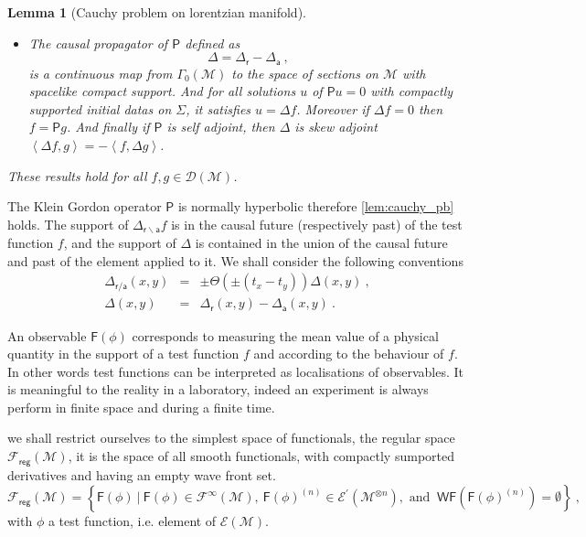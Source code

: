 \documentclass[10pt]{book}
\newcommand{\WF}{\mathsf{WF}}
\newcommand{\sm}[1]{\left\langle#1\right\rangle}
\newcommand{\Dcal}{\mathcal{D}}
\newcommand{\Ecal}{\mathcal{E}}
\newcommand{\Fcal}{\mathcal{F}}
\newcommand{\Mcal}{\mathcal{M}}
\newcommand{\Fsf}{\mathsf{F}}
\newcommand{\Psf}{\mathsf{P}}
\newcommand{\asf}{\mathsf{a}}
\newcommand{\rsf}{\mathsf{r}}
\theoremstyle{break}
\newtheorem{lemma}{Lemma}
\begin{document}
\begin{lemma}[Cauchy problem on lorentzian manifold]
\begin{itemize}
\item The causal propagator of $\Psf$ defined as
%
\begin{equation*}
\Delta = \Delta_\rsf - \Delta_\asf \ ,
\end{equation*}
%
is a continuous map from $\Gamma_0(\Mcal)$ to the space of sections on $\Mcal$ with spacelike compact support. And for all solutions $u$ of $\Psf u =0$ with compactly supported initial datas on $\Sigma$, it satisfies $u = \Delta f$. Moreover if $\Delta f =0$ then $f = \Psf g$. And finally if $\Psf$ is self adjoint, then $\Delta$ is skew adjoint $\sm{\Delta f,g} = - \sm{f,\Delta g}$.

\end{itemize}
%
These results hold for all $f, g \in \Dcal(\Mcal)$.
\end{lemma}


The Klein Gordon operator $\Psf$ is normally hyperbolic therefore \ref{lem:cauchy_pb} holds. The support of $\Delta_{\mathsf{\rsf\backslash\asf}} f$ is in the causal future (respectively past) of the test function $f$, and the support of $\Delta$ is contained in the union of the causal future and past of the element applied to it. We shall consider the following conventions
%
\begin{eqnarray*}
\Delta_{\rsf/\asf}(x,y) &=& \pm \Theta(\pm(t_x-t_y)) \Delta(x,y) \ ,\\
\Delta(x,y) &=& \Delta_\rsf(x,y)-\Delta_\asf(x,y) \ .
\end{eqnarray*}


An observable $\Fsf(\phi)$ corresponds to measuring the mean value of a physical quantity in the support of a test function $f$ and according to the behaviour of $f$. In other words test functions can be interpreted as localisations of observables. It is meaningful to the reality in a laboratory, indeed an experiment is always perform in finite space and during a finite time. 


\bigskip


we shall restrict ourselves to the simplest space of functionals, the regular space $\mathcal{F}_\mathsf{reg}(\Mcal)$, it is the space of all smooth functionals, with compactly sumported derivatives and having an empty wave front set. 
%
\begin{equation*}
\Fcal_{\mathsf{reg}}(\Mcal) = \left\{ \Fsf(\phi) \ \bigg| \ \Fsf(\phi) \in \Fcal^\infty(\Mcal), \ \Fsf(\phi)^{(n)} \in \Ecal^\prime(\Mcal^{\otimes n}), \mbox{ and } \ \WF(\Fsf(\phi)^{(n)}) = \emptyset \right\} \ ,
\end{equation*}
%
with $\phi$ a test function, i.e. element of $\Ecal(\Mcal)$.
\end{document}
